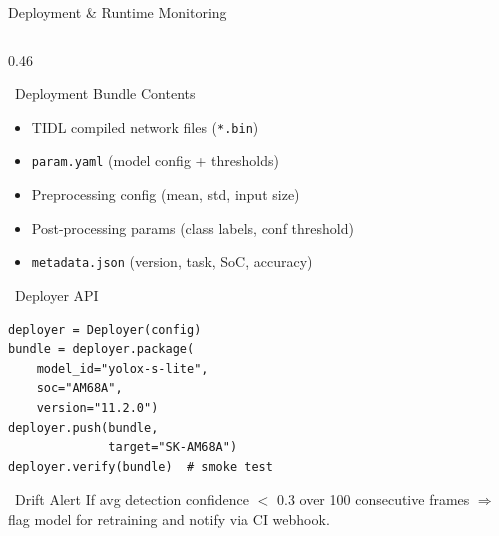 \documentclass[aspectratio=169,12pt]{beamer}
\begin{document}
\begin{frame}{Deployment \& Runtime Monitoring}
  \begin{columns}[T]
    \begin{column}{0.46\textwidth}
      \begin{block}{\faBox~Deployment Bundle Contents}
        \begin{itemize}\scriptsize
          \item TIDL compiled network files (\texttt{*.bin})
          \item \texttt{param.yaml} (model config + thresholds)
          \item Preprocessing config (mean, std, input size)
          \item Post-processing params (class labels, conf threshold)
          \item \texttt{metadata.json} (version, task, SoC, accuracy)
        \end{itemize}
      \end{block}
      \vspace{0.2cm}
      \begin{exampleblock}{\faPython~Deployer API}
        \begin{lstlisting}
deployer = Deployer(config)
bundle = deployer.package(
    model_id="yolox-s-lite",
    soc="AM68A",
    version="11.2.0")
deployer.push(bundle,
              target="SK-AM68A")
deployer.verify(bundle)  # smoke test
        \end{lstlisting}
      \end{exampleblock}
      \vspace{0.2cm}
      \begin{alertblock}{\scriptsize \faExclamationCircle~Drift Alert}
        \scriptsize If avg detection confidence $<$ 0.3 over 100
        consecutive frames $\Rightarrow$ flag model for retraining
        and notify via CI webhook.
      \end{alertblock}
    \end{column}


\end{columns}
\end{frame}
\end{document}
